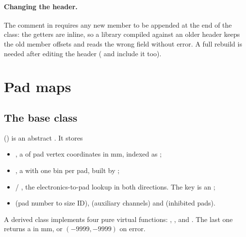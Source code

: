 \paragraph{Changing the header.} The comment in  requires any new member to be
appended at the end of the class: the getters are inline, so a library compiled against an older
header keeps the old member offsets and reads the wrong field without error. A full rebuild is needed
after editing the header ( and  include it too).

\section{Pad maps}
\label{sec:maps}

\subsection{The  base class}

 () is an abstract . It stores
\begin{itemize}
  \item {}, a  of pad vertex coordinates in mm,
    indexed as \code{[pad][vertex][x/y]};
  \item {}, a  with one bin per pad, built by ;
  \item {} / , the electronics-to-pad lookup in both directions. The
    key is an  ;
  \item {} (pad number to size ID),  (auxiliary channels) and
     (inhibited pads).
\end{itemize}
A derived class implements four pure virtual functions: , ,
 and . The last one returns a
 in mm, or $(-9999,-9999)$ on error.

